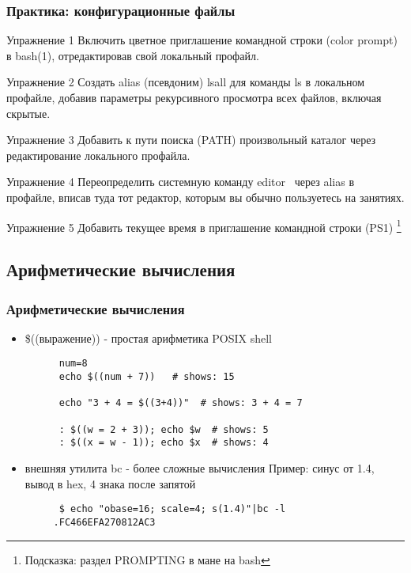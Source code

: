 \begin{frame}
  \frametitle{Практика: конфигурационные файлы}

  \alert{Упражнение 1} Включить цветное приглашение командной строки (color prompt) в bash(1), отредактировав свой локальный профайл.

  \alert{Упражнение 2} Создать alias (псевдоним) lsall для команды ls в локальном профайле, добавив параметры рекурсивного просмотра всех файлов, включая скрытые.

  \alert{Упражнение 3} Добавить к пути поиска (PATH) произвольный каталог через редактирование локального профайла.

  \alert{Упражнение 4} Переопределить системную команду \textqutedbl editor \textqutedbl\ через alias в профайле, вписав туда тот редактор, которым вы обычно пользуетесь на занятиях.

  \alert{Упражнение 5} Добавить текущее время в приглашение командной строки (PS1) \footnote{Подсказка: раздел PROMPTING в мане на bash}

\end{frame}

\subsection{Арифметические вычисления}
\begin{frame}[fragile]
  \frametitle{Арифметические вычисления}
  \begin{itemize}
    \item \alert{\$((выражение))} - простая арифметика POSIX shell 
      \begin{verbatim}
      num=8
      echo $((num + 7))   # shows: 15

      echo "3 + 4 = $((3+4))"  # shows: 3 + 4 = 7
      
      : $((w = 2 + 3)); echo $w  # shows: 5
      : $((x = w - 1)); echo $x  # shows: 4
      \end{verbatim} \pause
    \item внешняя утилита \alert{bc} - более сложные вычисления\newline
      Пример: синус от 1.4, вывод в hex, 4 знака после запятой
      \begin{verbatim}
      $ echo "obase=16; scale=4; s(1.4)"|bc -l 
     .FC466EFA270812AC3
      \end{verbatim}
  \end{itemize}

\end{frame}




